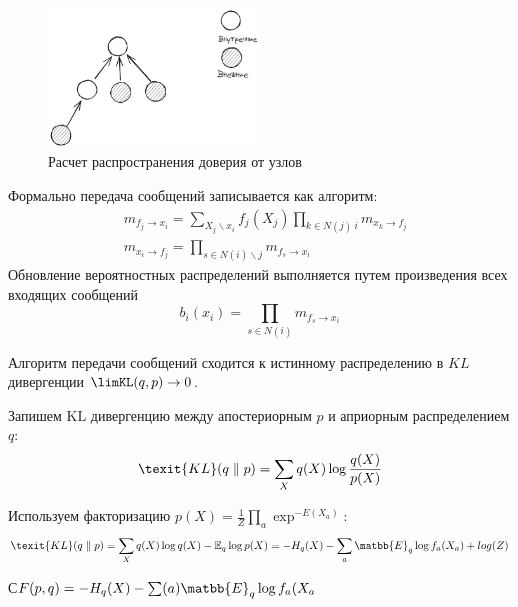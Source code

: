 \begin{figure}[h]
    \centering
    \includegraphics[width=0.5\textwidth]{assets/math/discrete/belief_propogation.excalidraw.png}
    \caption{Расчет распространения доверия от узлов}
    \label{discr_vs_gen}
\end{figure}

Формально передача сообщений записывается как алгоритм:
\begin{equation}
    \begin{aligned}
        &m_{f_j \rightarrow x_i} = \sum_{X_j \backslash x_i} f_j(X_j) \prod_{k\in N(j) \ i} m_{x_k \rightarrow f_j}\\
        &m_{x_i \rightarrow f_j} = \prod_{s \in N(i) \backslash j} m_{f_s \rightarrow x_i}
    \end{aligned}
\end{equation}
Обновление вероятностных распределений выполняется путем произведения всех входящих сообщений 
\begin{equation}
    b_i(x_i) = \prod_{s\in N(i)} m_{f_s \rightarrow x_i}
\end{equation}

\cite{yedidia2000generalized} Алгоритм передачи сообщений сходится к истинному распределению
в $KL$ дивергенции $\limKL(q,p) \rightarrow 0$. 

Запишем $\text{KL}$ дивергенцию между апостериорным $p$ и априорным распределением $q$:
\begin{equation}
    \texit{KL}(q \parallel p)= \sum_{X} q(X) \log \frac{q(X)}{p(X)}
\end{equation}

Используем факторизацию $p(X)= \frac{1}{Z} \prod_a \exp^{-E(X_a)}$:
\begin{equation}
    \texit{KL}(q \parallel p)= \sum_{X} q(X) \log q(X) - \mathbb{E}_q \log p(X) = - H_q(X) - \sum_a \matbb{E}_q \log f_a(X_a) +log(Z)
\end{equation}

С$F(p,q) = - H_q(X) - \sum(a) \matbb{E}_q \log f_a(X_a $

